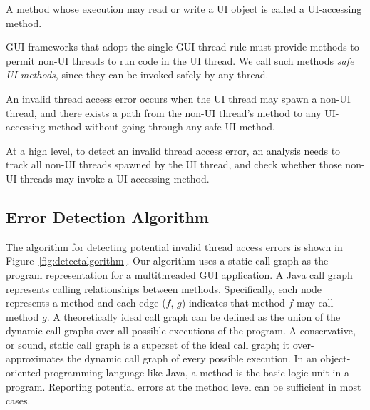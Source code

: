  { A method
whose execution may read or write a UI object is called a UI-accessing method.}\vspace{1mm}

 {GUI frameworks that
adopt the single-GUI-thread rule must provide methods to permit non-UI threads
to run code in the UI thread. We call such methods \textit{safe UI methods}, since
they can be invoked safely by any thread.}\vspace{1mm}

 {An invalid
thread access error occurs when the UI thread may spawn a non-UI thread, and there
exists a path from the non-UI thread's  method to any UI-accessing method
without going through any safe UI method. }\vspace{1mm}

At a high level, to detect an invalid thread access error, an analysis needs to track all
non-UI threads spawned by the UI thread, and check whether those non-UI threads
may invoke a UI-accessing method.

\tinystep

\subsection{Error Detection Algorithm}

The algorithm for detecting potential invalid thread access errors
is shown in Figure~\ref{fig:detectalgorithm}. Our algorithm uses a
static call graph as the program representation for a multithreaded
GUI application. A Java call graph represents calling relationships
between methods. Specifically, each node represents a method and each
edge ($f$, $g$) indicates that method $f$ may call method $g$.
A theoretically ideal call graph can be defined as the union of the
dynamic call graphs over all possible executions of the program. 
A conservative, or sound, static call graph is a superset of
the ideal call graph; it over-approximates the
dynamic call graph of every possible execution. 
In an object-oriented programming language like
Java, a method is the basic logic unit in a program. Reporting
potential errors at the method level can be sufficient in most cases.


